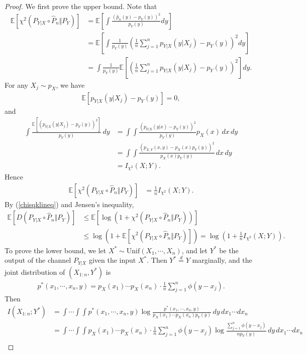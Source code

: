 \documentclass{article}
\numberwithin{equation}{section}
\newcommand{\E}{\mathbb{E}}
\newcommand{\wh}{\widehat}
\theoremstyle{plain}
\theoremstyle{definition}
\begin{document}
\begin{proof}
We first prove the upper bound. Note that
\begin{align*}
	\E\left[\chi^2(P_{Y|X}\circ\wh{P}_n\Vert P_Y)\right]&=\E\left[\int\frac{(\wh{p}_n(y)-p_Y(y))^2}{p_Y(y)}dy\right]\\
	&=\E\left[\int\frac{1}{p_Y(y)}\left(\frac{1}{n}\sum_{j=1}^n p_{Y|X}(y|X_j)-p_Y(y)\right)^2 dy\right]\\
	&=\int\frac{1}{p_Y(y)}\E\left[\left(\frac{1}{n}\sum_{j=1}^n p_{Y|X}(y|X_j)-p_Y(y)\right)^2\right]dy.
\end{align*}
For any $X_j\sim p_X$, we have
\begin{align*}
	\E\left[p_{Y|X}(y|X_j)-p_Y(y)\right]=0,
\end{align*}
and
\begin{align*}
	\int\frac{\E\left[(p_{Y|X}(y|X_j)-p_Y(y))^2\right]}{p_Y(y)}\,dy&=\int\int \frac{(p_{Y|X}(y|x)-p_Y(y))^2}{p_Y(y)}p_X(x)\,dx\,dy\\
	&=\int\int\frac{(p_{X,Y}(x,y)-p_X(x)p_Y(y))^2}{p_X(x)p_Y(y)}\,dx\,dy\\
	&=I_{\chi^2}(X;Y).
\end{align*}
Hence
\begin{align*}
	\E\left[\chi^2(P_{Y|X}\circ\wh{P}_n\Vert P_Y)\right]&=\frac{1}{n}I_{\chi^2}(X;Y).
\end{align*}
By (\ref{chisqklineq}) and Jensen's inequality,
\begin{align*}
	\E\left[D(P_{Y|X}\circ\wh{P}_n\Vert P_Y)\right]&\leq\E\left[\log\left(1+\chi^2(P_{Y|X}\circ\wh{P}_n\Vert P_Y)\right)\right]\\
	&\leq\log\left(1+\E\left[\chi^2(P_{Y|X}\circ\wh{P}_n\Vert P_Y)\right]\right)=\log\left(1+\frac{1}{n}I_{\chi^2}(X;Y)\right).
\end{align*}
To prove the lower bound, we let $X^*\sim\mathrm{Unif}(X_1,\cdots,X_n)$, and let $Y^*$ be the output of the channel $P_{Y|X}$ given the input $X^*$. Then $Y^*\overset{d}{=}Y$ marginally, and the joint distribution of $(X_{1:n},Y^*)$ is
\begin{align*}
	p^*(x_1,\cdots,x_n,y)=p_X(x_1)\cdots p_X(x_n)\cdot \frac{1}{n}\sum_{j=1}^n\phi(y-x_j).
\end{align*}
Then
\begin{equation}
\begin{aligned}
	I(X_{1:n};Y^*)&=\int\cdots\int\int p^*(x_1,\cdots,x_n,y)\log\frac{p^*(x_1,\cdots,x_n,y)}{p_X(x_1)\cdots p_X(x_n)p_Y(y)}\,dy\,dx_1\cdots dx_n\\
	&=\int\cdots\int\int p_X(x_1)\cdots p_X(x_n)\cdot \frac{1}{n}\sum_{j=1}^n\phi(y-x_j)\log\frac{\sum_{j=1}^n\phi(y-x_j)}{np_Y(y)}\,dy\,dx_1\cdots dx_n\\

\end{aligned}
\end{equation}
\end{proof}
\end{document}
